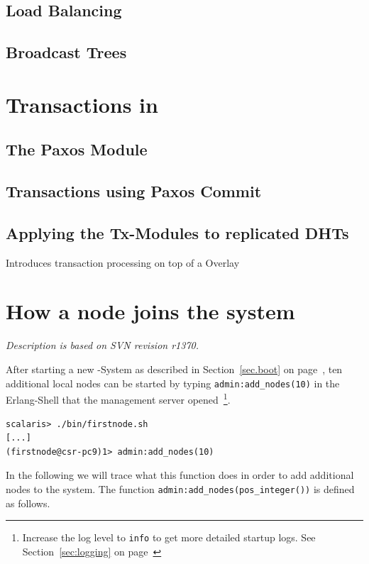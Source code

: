 \documentclass[a4paper]{scrreprt}
\newcommand{\sieheref}[1]{\ref{#1} on page~\pageref{#1}}
\newcommand{\code}[1]{\lstinline[basicstyle=\ttfamily]!#1!}
\newcommand{\svnrev}[1]
{\hfill\emph{Description is based on SVN revision #1.}\medskip}
\begin{document}
\section{Load Balancing}

\section{Broadcast Trees}



\chapter{Transactions in \scalaris{}}
\label{chapter.transactions}

\section{The Paxos Module}

\section{Transactions using Paxos Commit}

\section{Applying the Tx-Modules to replicated DHTs}

Introduces transaction processing on top of a Overlay



\chapter{How a node joins the system}
\label{chapter.join}
\svnrev{r1370}

After starting a new \scalaris{}-System as described in
Section~\sieheref{sec.boot}, ten additional local nodes can be started
by typing \code{admin:add_nodes(10)} in the Erlang-Shell that the management
server opened~\footnote{Increase the log level to {\tt info} to get
more detailed startup logs. See Section~\sieheref{sec:logging}}.


\lstset{language=erlang}
\begin{lstlisting}
scalaris> ./bin/firstnode.sh 
[...]
(firstnode@csr-pc9)1> admin:add_nodes(10)
\end{lstlisting}

In the following we will trace what this function does in order to add
additional nodes to the system.
The function \code{admin:add_nodes(pos_integer())} is defined as follows.
\end{document}
